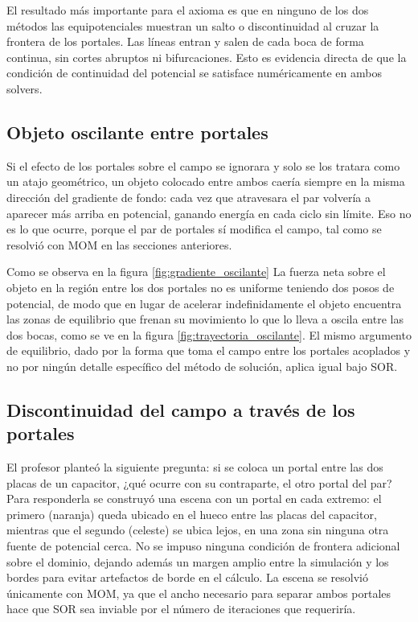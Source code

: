 \documentclass[12pt, twocolumn]{article}
\begin{document}
El resultado más importante para el axioma es que en ninguno de los dos métodos las equipotenciales muestran un salto o discontinuidad al cruzar la frontera de los portales. Las líneas entran y salen de cada boca de forma continua, sin cortes abruptos ni bifurcaciones. Esto es evidencia directa de que la condición de continuidad del potencial se satisface numéricamente en ambos solvers.





\subsection{Objeto oscilante entre portales}

Si el efecto de los portales sobre el campo se ignorara y solo se los tratara como un atajo geométrico, un objeto colocado entre ambos caería siempre en la misma dirección del gradiente de fondo: cada vez que atravesara el par volvería a aparecer más arriba en potencial, ganando energía en cada ciclo sin límite. Eso no es lo que ocurre, porque el par de portales sí modifica el campo, tal como se resolvió con MOM en las secciones anteriores.

Como se observa en la figura \ref{fig:gradiente_oscilante} La fuerza neta sobre el objeto en la región entre los dos portales no es uniforme teniendo dos posos de potencial, de modo que en lugar de acelerar indefinidamente el objeto encuentra las zonas de equilibrio que frenan su movimiento lo que lo lleva a oscila entre las dos bocas, como se ve en la figura \ref{fig:trayectoria_oscilante}. El mismo argumento de equilibrio, dado por la forma que toma el campo entre los portales acoplados y no por ningún detalle específico del método de solución, aplica igual bajo SOR.

\subsection{Discontinuidad del campo a través de los portales}

El profesor planteó la siguiente pregunta: si se coloca un portal entre las dos placas de un capacitor, ¿qué ocurre con su contraparte, el otro portal del par? Para responderla se construyó una escena con un portal en cada extremo: el primero (naranja) queda ubicado en el hueco entre las placas del capacitor, mientras que el segundo (celeste) se ubica lejos, en una zona sin ninguna otra fuente de potencial cerca. No se impuso ninguna condición de frontera adicional sobre el dominio, dejando además un margen amplio entre la simulación y los bordes para evitar artefactos de borde en el cálculo. La escena se resolvió únicamente con MOM, ya que el ancho necesario para separar ambos portales hace que SOR sea inviable por el número de iteraciones que requeriría.
\end{document}
